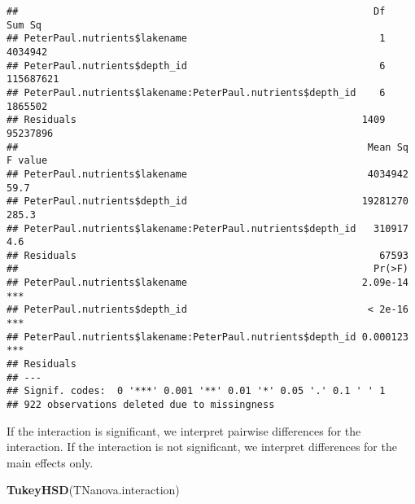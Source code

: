 \documentclass[]{article}
\newenvironment{Shaded}{\begin{snugshade}}{\end{snugshade}}
\newcommand{\KeywordTok}[1]{\textcolor[rgb]{0.13,0.29,0.53}{\textbf{#1}}}
\newcommand{\NormalTok}[1]{#1}
\begin{document}
\begin{verbatim}
##                                                             Df    Sum Sq
## PeterPaul.nutrients$lakename                                 1   4034942
## PeterPaul.nutrients$depth_id                                 6 115687621
## PeterPaul.nutrients$lakename:PeterPaul.nutrients$depth_id    6   1865502
## Residuals                                                 1409  95237896
##                                                            Mean Sq F value
## PeterPaul.nutrients$lakename                               4034942    59.7
## PeterPaul.nutrients$depth_id                              19281270   285.3
## PeterPaul.nutrients$lakename:PeterPaul.nutrients$depth_id   310917     4.6
## Residuals                                                    67593        
##                                                             Pr(>F)    
## PeterPaul.nutrients$lakename                              2.09e-14 ***
## PeterPaul.nutrients$depth_id                               < 2e-16 ***
## PeterPaul.nutrients$lakename:PeterPaul.nutrients$depth_id 0.000123 ***
## Residuals                                                             
## ---
## Signif. codes:  0 '***' 0.001 '**' 0.01 '*' 0.05 '.' 0.1 ' ' 1
## 922 observations deleted due to missingness
\end{verbatim}

If the interaction is significant, we interpret pairwise differences for
the interaction. If the interaction is not significant, we interpret
differences for the main effects only.

\begin{Shaded}
\begin{Highlighting}[]
\KeywordTok{TukeyHSD}\NormalTok{(TNanova.interaction)}
\end{Highlighting}
\end{Shaded}
\end{document}

